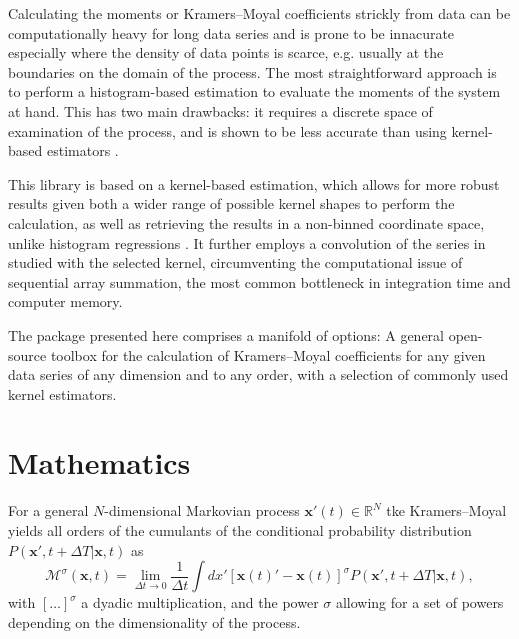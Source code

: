 \documentclass[showpacs,showkeys,10pt,onecolumn,superscriptaddress,notitlepage]{revtex4-1}
\begin{document}
Calculating the moments or Kramers--Moyal coefficients strickly from data can be computationally heavy for long data series and is prone to be innacurate especially where the density of data points is scarce, e.g. usually at the boundaries on the domain of the process.
The most straightforward approach is to perform a histogram-based estimation to evaluate the moments of the system at hand.
This has two main drawbacks: it requires a discrete space of examination of the process, and is shown to be less accurate than using kernel-based estimators \cite{Lamouroux}.

This library is based on a kernel-based estimation, which allows for more robust results given both a wider range of possible kernel shapes to perform the calculation, as well as retrieving the results in a non-binned coordinate space, unlike histogram regressions \cite{Silverman}.
It further employs a convolution of the series in studied with the selected kernel, circumventing the computational issue of sequential array summation, the most common bottleneck in integration time and computer memory.

The package presented here comprises a manifold of options: A general open-source toolbox for the calculation of Kramers--Moyal coefficients for any given data series of any dimension and to any order, with a selection of commonly used kernel estimators.


\section{Mathematics}
For a general $N$-dimensional Markovian process $\boldsymbol{x}'(t)\in\mathbb{R}^N$ tke Kramers--Moyal yields all orders of the cumulants of the conditional probability distribution $P(\boldsymbol{x}',t+\Delta T | \boldsymbol{x}, t)$ as \cite{Risken}
\begin{equation}
\mathcal{M}^{\sigma}(\boldsymbol{x},t)=\lim_{\Delta t\to 0}\frac{1}{\Delta t}\int  dx'[\boldsymbol{x}(t)'-\boldsymbol{x}(t)]^\sigma P(\boldsymbol{x}',t+\Delta T | \boldsymbol{x}, t),
\end{equation}
with $[\dots]^\sigma$ a dyadic multiplication, and the power $\sigma$ allowing for a set of powers depending on the dimensionality of the process.
\end{document}
